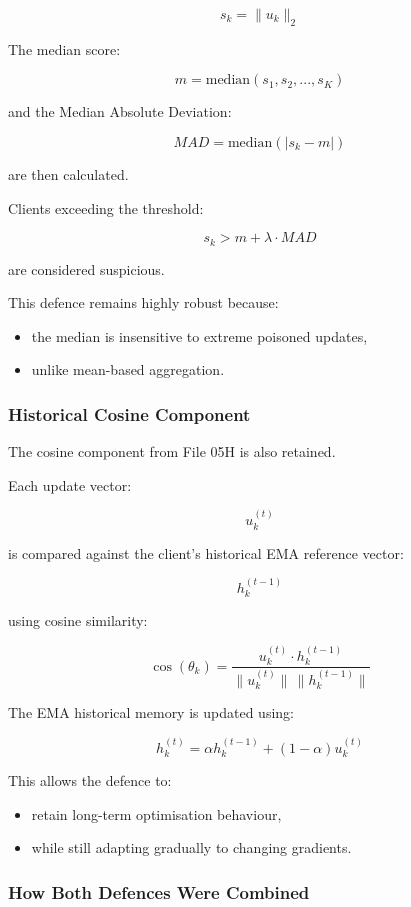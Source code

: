 \[
s_k = \|u_k\|_2
\]

The median score:

\[
m = \mathrm{median}(s_1, s_2, ..., s_K)
\]

and the Median Absolute Deviation:

\[
MAD = \mathrm{median}(|s_k - m|)
\]

are then calculated.

Clients exceeding the threshold:

\[
s_k > m + \lambda \cdot MAD
\]

are considered suspicious.

This defence remains highly robust because:
\begin{itemize}
    \item the median is insensitive to extreme poisoned updates,
    \item unlike mean-based aggregation.
\end{itemize}

\subsubsection*{Historical Cosine Component}

The cosine component from File 05H is also retained.

Each update vector:

\[
u_k^{(t)}
\]

is compared against the client's historical EMA reference vector:

\[
h_k^{(t-1)}
\]

using cosine similarity:

\[
\cos(\theta_k)
=
\frac{
u_k^{(t)}
\cdot
h_k^{(t-1)}
}{
\|u_k^{(t)}\|
\,
\|h_k^{(t-1)}\|
}
\]

The EMA historical memory is updated using:

\[
h_k^{(t)}
=
\alpha h_k^{(t-1)}
+
(1-\alpha)u_k^{(t)}
\]

This allows the defence to:
\begin{itemize}
    \item retain long-term optimisation behaviour,
    \item while still adapting gradually to changing gradients.
\end{itemize}

\subsubsection*{How Both Defences Were Combined}

